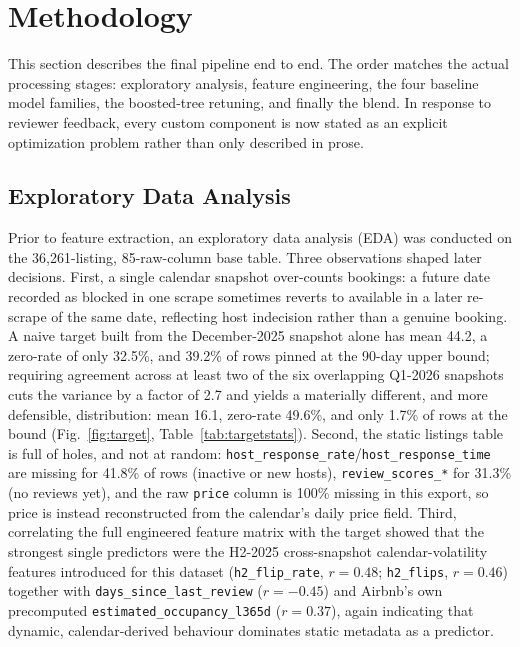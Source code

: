 \documentclass[journal]{IEEEtran}
\begin{document}
\section{Methodology}
\label{sec:method}
This section describes the final pipeline end to end. The order matches the
actual processing stages: exploratory analysis, feature engineering,
the four baseline model families, the boosted-tree retuning, and finally the
blend. In response to reviewer feedback, every custom component is now stated as
an explicit optimization problem rather than only described in prose.

\subsection{Exploratory Data Analysis}
\label{sec:eda}
Prior to feature extraction, an exploratory data analysis (EDA) was conducted
on the 36{,}261-listing, 85-raw-column base table. Three observations shaped
later decisions. First, a single calendar snapshot over-counts bookings: a
future date recorded as blocked in one scrape sometimes reverts to available
in a later re-scrape of the same date, reflecting host indecision rather than a
genuine booking. A naive target built from the December-2025 snapshot alone has
mean 44.2, a zero-rate of only 32.5\%, and 39.2\% of rows pinned at the 90-day
upper bound; requiring agreement across at least two of the six overlapping
Q1-2026 snapshots\label{sec:targetconstruction} cuts the variance by a factor
of 2.7 and yields a materially different, and more defensible, distribution:
mean 16.1, zero-rate 49.6\%, and only 1.7\% of rows at the bound
(Fig.~\ref{fig:target}, Table~\ref{tab:targetstats}). Second, the static
listings table is full of holes, and not at random:
\texttt{host\_response\_rate}/\texttt{host\_response\_time} are missing for
41.8\% of rows (inactive or new hosts), \texttt{review\_scores\_*} for 31.3\%
(no reviews yet), and the raw \texttt{price} column is 100\% missing in this
export, so price is instead reconstructed from the calendar's daily price
field. Third, correlating the full engineered feature matrix with the target
showed that the strongest single predictors were the H2-2025 cross-snapshot
calendar-volatility features introduced for this dataset
(\texttt{h2\_flip\_rate}, $r=0.48$; \texttt{h2\_flips}, $r=0.46$) together with
\texttt{days\_since\_last\_review} ($r=-0.45$) and Airbnb's own precomputed
\texttt{estimated\_occupancy\_l365d} ($r=0.37$), again indicating that dynamic,
calendar-derived behaviour dominates static metadata as a predictor.
\end{document}

